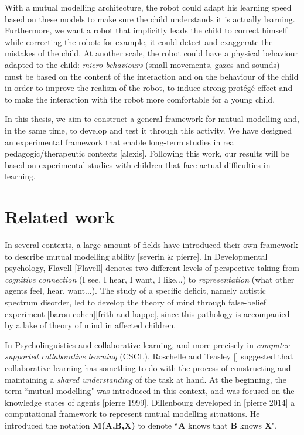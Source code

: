 \documentclass[10pt,a4paper,twocolumn]{article}
\begin{document}
With a mutual modelling architecture, the robot could adapt his learning speed based on these models to make sure the child understands it is actually learning. Furthermore, we want a robot that implicitly leads the child to correct himself while correcting the robot: for example, it could detect and exaggerate the mistakes of the child. At another scale, the robot could have a physical behaviour adapted to the child: \textit{micro-behaviours} (small movements, gazes and sounds) must be based on the content of the interaction and on the behaviour of the child in order to improve the realism of the robot, to induce strong prot\'eg\'e effect and to make the interaction with the robot more comfortable for a young child. 

In this thesis, we aim to construct a general framework for mutual modelling and, in the same time, to develop and test it through this activity. We have designed an experimental framework that enable long-term studies in real pedagogic/therapeutic contexts [alexis]. Following this work, our results will be based on experimental studies with children that face actual difficulties in learning. 

\section{Related work}


In several contexts, a large amount of fields have introduced their own framework to describe mutual modelling ability [severin \& pierre]. 
In Developmental psychology, Flavell [Flavell] denotes two different levels of perspective taking from \textit{cognitive connection} (I see, I hear, I want, I like...) to \textit{representation} (what other agents feel, hear, want...). The study of a specific deficit, namely autistic spectrum disorder, led to develop the theory of mind through false-belief experiment [baron cohen][frith and happe], since this pathology is accompanied by a lake of theory of mind in affected children. 

In Psycholinguistics and collaborative learning, and more precisely in \textit{computer supported collaborative learning} (CSCL), Roschelle and Teasley [] suggested that collaborative learning has something to do with the process of constructing and maintaining a \textit{shared understanding} of the task at hand. 
At the beginning, the term ``mutual modelling" was introduced in this context, and was focused on the knowledge states of agents [pierre 1999].  Dillenbourg developed in [pierre 2014] a computational framework to represent mutual modelling situations. He introduced the notation \textbf{M(A,B,X)} to denote ``\textbf{A} knows that \textbf{B} knows \textbf{X}".
\end{document}
